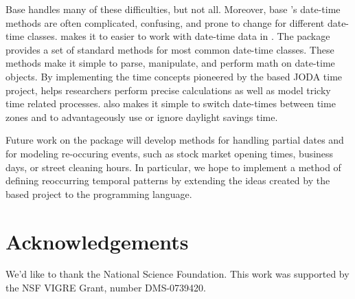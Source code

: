 \documentclass[article]{jss}
\begin{document}
Base  handles many of these difficulties, but not all. Moreover, base 's date-time methods are often complicated, confusing, and prone to change for different date-time classes.  makes it to easier to work with date-time data in . The package provides a set of standard methods for most common date-time classes. These methods make it simple to parse, manipulate, and perform math on date-time objects. By implementing the time concepts pioneered by the  based JODA time project,  helps researchers perform precise calculations as well as model tricky time related processes.  also makes it simple to switch date-times between time zones and to advantageously use or ignore daylight savings time.

Future work on the  package will develop methods for handling partial dates and for modeling re-occuring events, such as stock market opening times, business days, or street cleaning hours. In particular, we hope to implement a method of defining reoccurring temporal patterns by extending the ideas created by the  based  project \citep{runts} to the  programming language.

\section*{Acknowledgements}
We'd like to thank the National Science Foundation. This work was supported by the NSF VIGRE Grant, number  DMS-0739420.



\end{document}
